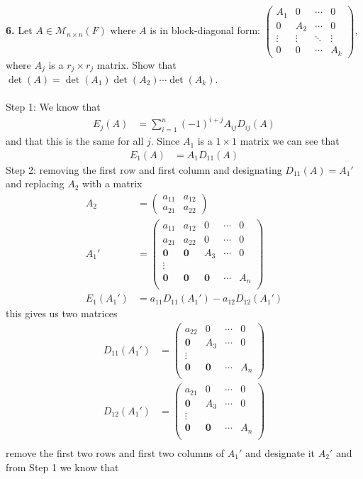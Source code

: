 \documentclass[11pt]{amsart}
\theoremstyle{definition}  %
\begin{document}
\newpage
\vskip 0.1cm
\noindent
{\bf 6.} Let $A \in \mathcal{M}_{n \times n}(F)$ where $A$ is in block-diagonal form:
$\left( \begin{array}{cccc} A_1 & 0 & \cdots & 0 \\
0 & A_2 & \cdots & 0 \\
\vdots & \vdots & \ddots & \vdots \\
0 & 0 & \cdots & A_k 
\end{array} \right),$
where $A_j$ is a $r_j \times r_j$ matrix. Show that $\det(A) = \det(A_1) \det(A_2) \cdots \det(A_k)$. \\
\\
Step 1: We know that 
\begin{align*}
	E_j(A) &= \sum_{i=1}^n (-1)^{i+j}A_{ij}D_{ij}(A)
\end{align*}and that this is the same for all $j$.  Since $A_1$ is a $1\times 1$ matrix we can see that 
\begin{align*}
	E_1(A) &= A_1D_{11}(A) 
\end{align*}Step 2: removing the first row and first column and designating $D_{11}(A) = A_1'$ and replacing $A_2$ with a matrix
\begin{align*}
	A_2 &= \begin{pmatrix}
		a_{11} & a_{12}\\
		a_{21} & a_{22}
	\end{pmatrix} \\
	A_1' &= \begin{pmatrix}
		a_{11} & a_{12} & 0 & \cdots & 0\\
		a_{21} & a_{22} & 0 & \cdots & 0\\
		\textbf{0} & \textbf{0} & A_3 & \cdots & 0 \\
		\vdots \\
		\textbf{0} & \textbf{0} & \textbf{0} & \cdots & A_n \\
	\end{pmatrix} \\
	E_1(A_1') &= a_{11}D_{11}(A_1')-a_{12}D_{12}(A_1')
\end{align*}this gives us two matrices
\begin{align*}
	D_{11}(A_1') &= \begin{pmatrix}
		 a_{22} & 0 & \cdots & 0\\
		 \textbf{0} & A_3 & \cdots & 0 \\
		\vdots \\
		 \textbf{0} & \textbf{0} & \cdots & A_n \\	
\end{pmatrix}	 \\
	D_{12}(A_1') &= \begin{pmatrix}
		 a_{21} & 0 & \cdots & 0\\
		 \textbf{0} & A_3 & \cdots & 0 \\
		\vdots \\
		 \textbf{0} & \textbf{0} & \cdots & A_n \\	
\end{pmatrix}	 \\
\end{align*}remove the first two rows and first two columns of $A_1'$ and designate it $A_2'$ and from Step 1 we know that
\end{document}
